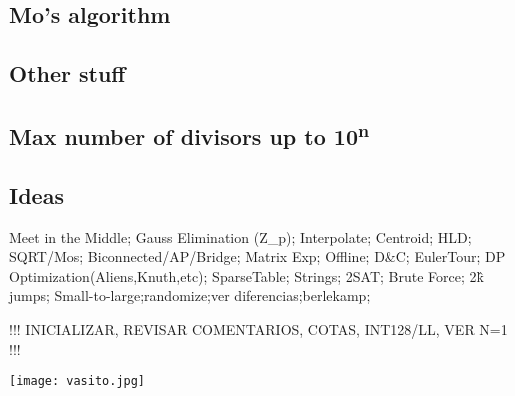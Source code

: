 \subsection{Mo's algorithm}

\subsection{Other stuff}

\subsection{Max number of divisors up to 10\textsuperscript{n}}

\subsection{Ideas}
Meet in the Middle; Gauss Elimination (Z\_p); Interpolate; Centroid; HLD;
SQRT/Mos; Biconnected/AP/Bridge; Matrix Exp; Offline; D\&C; EulerTour;
DP Optimization(Aliens,Knuth,etc); SparseTable; Strings; 2SAT;
Brute Force; 2\^k jumps;
Small-to-large;randomize;ver diferencias;berlekamp;

!!! INICIALIZAR, REVISAR COMENTARIOS, COTAS, INT128/LL, VER N=1 !!!

\texttt{[image: vasito.jpg]}




